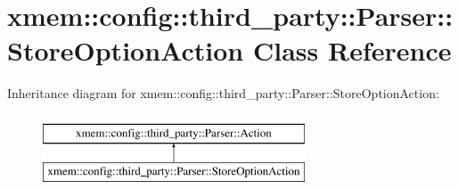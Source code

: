 \hypertarget{classxmem_1_1config_1_1third__party_1_1_parser_1_1_store_option_action}{\section{xmem\-:\-:config\-:\-:third\-\_\-party\-:\-:Parser\-:\-:Store\-Option\-Action Class Reference}
\label{classxmem_1_1config_1_1third__party_1_1_parser_1_1_store_option_action}
}
Inheritance diagram for xmem\-:\-:config\-:\-:third\-\_\-party\-:\-:Parser\-:\-:Store\-Option\-Action\-:\begin{figure}[H]
\begin{center}
\leavevmode
\includegraphics[height=2.000000cm]{classxmem_1_1config_1_1third__party_1_1_parser_1_1_store_option_action}
\end{center}
\end{figure}
